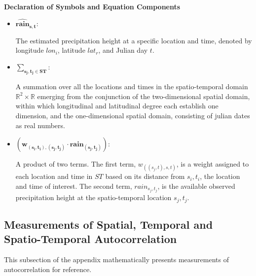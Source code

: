 \documentclass[
  12pt,
]{article}
\begin{document}
\vspace{0.75cm}

\begin{center}
\textbf{Declaration of Symbols and Equation Components}
\end{center}

\begin{itemize}[label={}]
\item $\mathbf{\widehat{rain}_{s,t}}$:\\
  \begin{adjustwidth}{1cm}{0cm} The estimated precipitation height at a specific location and time, denoted by longitude $lon_i$, latitude $lat_r$, and Julian day $t$. \end{adjustwidth}
\item $\mathbf{{\displaystyle \sum_{s_j,t_j\in ST}}}$:\\ 
  \begin{adjustwidth}{1cm}{0cm} 
  A summation over all the locations and times in the spatio-temporal domain $\mathbb{R}^2\times\mathbb{R}$ emerging from the conjunction of the two-dimensional spatial domain, within which longitudinal and latitudinal degree each establish one dimension, and the one-dimensional spatial domain, consisting of julian dates as real numbers. 
  \end{adjustwidth}
\item $\mathbf{\left(w_{(s_i,t_i),(s_j,t_j)} \cdot rain_{(s_j,t_j)}\right)}$:\\
  \begin{adjustwidth}{1cm}{0cm} 
  A product of two terms. The first term, $w_{((s_j,t),s,t)}$, is a weight assigned to each location and time in $ST$ based on its distance from $s_i,t_i$, the location and time of interest. The second term, $rain_{s_j,t_j}$, is the available observed precipitation height at the spatio-temporal location $s_{j},t_{j}$.
  \end{adjustwidth}
\end{itemize}

\clearpage

\hypertarget{measurements-of-spatial-temporal-and-spatio-temporal-autocorrelation}{%
\subsection{Measurements of Spatial, Temporal and Spatio-Temporal
Autocorrelation}\label{measurements-of-spatial-temporal-and-spatio-temporal-autocorrelation}}

This subsection of the appendix mathematically presents measurements of
autocorrelation for reference.
\end{document}
